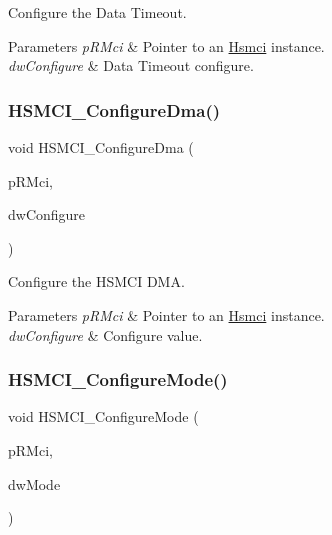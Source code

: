 Configure the Data Timeout. 


\begin{DoxyParams}{Parameters}
{\em p\+R\+Mci} & Pointer to an \mbox{\hyperlink{structHsmci}{Hsmci}} instance. \\
\hline
{\em dw\+Configure} & Data Timeout configure. \\
\hline
\end{DoxyParams}
\mbox{\label{group__hsmci__functions_gaceb167f796372edad0ce22b545dfbf54}} 
\subsubsection{\texorpdfstring{HSMCI\_ConfigureDma()}{HSMCI\_ConfigureDma()}}
{\footnotesize\ttfamily void H\+S\+M\+C\+I\+\_\+\+Configure\+Dma (\begin{DoxyParamCaption}\item[{\mbox{\hyperlink{structHsmci}{Hsmci}} $\ast$}]{p\+R\+Mci,  }\item[{uint32\+\_\+t}]{dw\+Configure }\end{DoxyParamCaption})}



Configure the H\+S\+M\+CI D\+MA. 


\begin{DoxyParams}{Parameters}
{\em p\+R\+Mci} & Pointer to an \mbox{\hyperlink{structHsmci}{Hsmci}} instance. \\
\hline
{\em dw\+Configure} & Configure value. \\
\hline
\end{DoxyParams}
\mbox{\label{group__hsmci__functions_gaf51e5a4c668bd49302fbab8329215445}} 
\subsubsection{\texorpdfstring{HSMCI\_ConfigureMode()}{HSMCI\_ConfigureMode()}}
{\footnotesize\ttfamily void H\+S\+M\+C\+I\+\_\+\+Configure\+Mode (\begin{DoxyParamCaption}\item[{\mbox{\hyperlink{structHsmci}{Hsmci}} $\ast$}]{p\+R\+Mci,  }\item[{uint32\+\_\+t}]{dw\+Mode }\end{DoxyParamCaption})}



